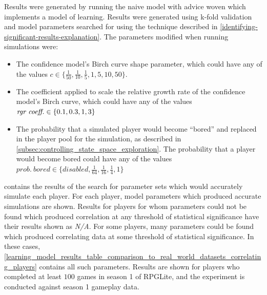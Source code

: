 Results were generated by running the naive model with advice woven which implements a
model of learning. Results were generated using k-fold validation and model
parameters searched for using the technique described in
\cref{identifying-significant-results-explanation}. The parameters modified when
running simulations were:

\begin{itemize}
  \item The confidence model's Birch curve shape parameter, which could have any
  of the values $c \in \{\frac{1}{50}, \frac{1}{10},
    \frac{1}{5}, 1, 5, 10, 50\}$.
    \item The coefficient applied to scale the relative growth rate of the
      confidence model's Birch curve, which could have any of the values
      $\textrm{\emph{rgr~coeff.}} \in \{0.1, 0.3, 1, 3\}$
    \item The probability that a simulated player would become ``bored'' and
    replaced in the player pool for the simulation, as described in
    \cref{subsec:controlling_state_space_exploration}. The probability that a
    player would become bored could have any of the values $prob.~bored \in
    \{disabled, \frac{1}{64}, \frac{1}{16}, \frac{1}{4}, 1\}$
\end{itemize}

contains the results of the search for parameter sets which would accurately
simulate each player. For each player, model parameters which produced accurate
simulations are shown. Results for players for whom parameters could not be
found which produced correlation at any threshold of statistical significance
have their results shown as \emph{N/A}. For some players, many parameters could
be found which produced correlating data at some threshold of statistical
significance. In these cases,
\cref{learning_model_results_table_comparison_to_real_world_datasets_correlating_players}
contains all such parameters. Results are shown for players who completed at
least $100$ games in season 1 of RPGLite, and the experiment is conducted
against season 1 gameplay data.


